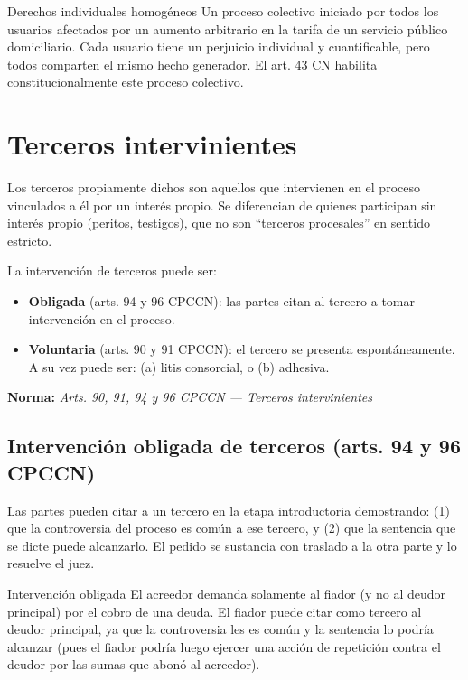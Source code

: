 \documentclass[12pt,oneside]{book}
\newcommand{\norma}[1]{%
\par\noindent\textbf{Norma:} \textit{#1}\par\smallskip
}
\begin{document}
\begin{example}{Derechos individuales homogéneos}
Un proceso colectivo iniciado por todos los usuarios afectados por un aumento arbitrario en la tarifa de un servicio público domiciliario. Cada usuario tiene un perjuicio individual y cuantificable, pero todos comparten el mismo hecho generador. El art. 43 CN habilita constitucionalmente este proceso colectivo.
\end{example}

\section{Terceros intervinientes}

Los terceros propiamente dichos son aquellos que intervienen en el proceso vinculados a él por un interés propio. Se diferencian de quienes participan sin interés propio (peritos, testigos), que no son ``terceros procesales'' en sentido estricto.

La intervención de terceros puede ser:

\begin{itemize}
    \item \textbf{Obligada} (arts. 94 y 96 CPCCN): las partes citan al tercero a tomar intervención en el proceso.
    \item \textbf{Voluntaria} (arts. 90 y 91 CPCCN): el tercero se presenta espontáneamente. A su vez puede ser: (a) litis consorcial, o (b) adhesiva.
\end{itemize}

\norma{Arts. 90, 91, 94 y 96 CPCCN --- Terceros intervinientes}

\subsection{Intervención obligada de terceros (arts. 94 y 96 CPCCN)}

Las partes pueden citar a un tercero en la etapa introductoria demostrando: (1) que la controversia del proceso es común a ese tercero, y (2) que la sentencia que se dicte puede alcanzarlo. El pedido se sustancia con traslado a la otra parte y lo resuelve el juez.

\begin{example}{Intervención obligada}
El acreedor demanda solamente al fiador (y no al deudor principal) por el cobro de una deuda. El fiador puede citar como tercero al deudor principal, ya que la controversia les es común y la sentencia lo podría alcanzar (pues el fiador podría luego ejercer una acción de repetición contra el deudor por las sumas que abonó al acreedor).
\end{example}
\end{document}
